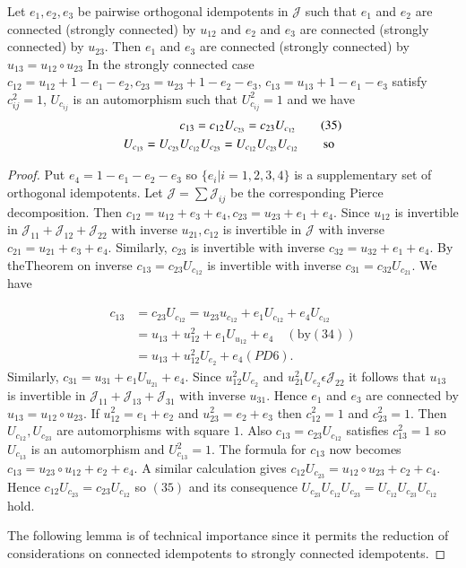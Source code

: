 \setcounter{lemma}{0}
\begin{lemma}\label{c2:sec3:lem1}
  Let $e_1,e_2,e_3$ be pairwise orthogonal idempotents in
  $\mathscr{J}$ such that $e_1$ and $e_2$ are connected (strongly
  connected) by $u_{12}$ and $e_2$ and $e_3$ are connected (strongly
  connected) by $u_{23}$. Then $e_1$ and $e_3$ are connected (strongly
  connected) by $u_{13}=u_{12}\circ u_{23}$ In the strongly connected
  case $c_{12}=u_{12}+1-e_1-e_2,c_{23}=u_{23}+1-e_{2}-e_3$,
  $c_{13}=u_{13}+1-e_1-e_3$ satisfy $c^{2}_{ij}=1$, $U_{c_{ij}}$ is an
  automorphism such that $U^{2}_{c_{ij}}=1$ and we have
\begin{align*}
&c_{13}=c_{12}U_{c_{23}}=c_{23}U_{c_{12}}\tag{35}\label{c2:eq35}\\
U_{c_{13}}=U_{c_{23}}&U_{c_{12}}U_{c_{23}}=U_{c_{12}}U_{c_{23}}U_{c_{12}}\tag*{\text{so}}
\end{align*}
\end{lemma}

\begin{proof}
Put $e_4=1-e_1-e_2-e_3$ so $\{e_i|i=1,2,3,4\}$ is a supplementary set
of orthogonal idempotents. Let $\mathscr{J}=\sum\mathscr{J}_{ij}$ be
the corresponding Pierce decomposition. Then
$c_{12}=u_{12}+e_3+e_4,c_{23}=u_{23}+e_1+e_4$. Since $u_{12}$ is
invertible in $\mathscr{J}_{11}+\mathscr{J}_{12}+\mathscr{J}_{22}$
with inverse $u_{21},c_{12}$ is invertible in $\mathscr{J}$ with
inverse $c_{21}=u_{21}+e_3+e_4$. Similarly, $c_{23}$ is invertible
with inverse $c_{32}=u_{32}+e_1+e_4$. By the\pageoriginale Theorem on
inverse $c_{13}=c_{23}U_{c_{12}}$ is invertible with inverse
$c_{31}=c_{32}U_{c_{21}}$. We have

\begin{align*}
c_{13}&=c_{23}U_{c_{12}}= u_{23} u_{c_{12}} + e_1 U_{c_{12}} + e_4U_{c_{12}}\\
&=u_{13}+u^{2}_{12}+e_1U_{u_{12}}+e_{4}\quad (\text{by} (34))\\
&=u_{13}+u^{2}_{12}U_{e_{2}}+e_4 (PD 6).
\end{align*}
Similarly, $c_{31}=u_{31}+e_1U_{u_{21}}+e_4$. Since
$u^{2}_{12}U_{e_{2}}$ and $u^{2}_{21}U_{e_{2}}\epsilon
\mathscr{J}_{22}$ it follows that $u_{13}$ is invertible in
$\mathscr{J}_{11}+\mathscr{J}_{13}+\mathscr{J}_{31}$ with inverse
$u_{31}$. Hence $e_{1}$ and $e_{3}$ are connected by
$u_{13}=u_{12}\circ u_{23}$. If $u^{2}_{12}=e_1+e_2$ and
$u^{2}_{23}=e_2+e_3$ then $c^{2}_{12}=1$ and $c^{2}_{23}=1$. Then
$U_{c_{12}}, U_{c_{23}}$ are automorphisms with square $1$. Also
$c_{13}=c_{23}U_{c_{12}}$ satisfies $c^{2}_{13}=1$ so $U_{c_{13}}$ is
an automorphism and $U^{2}_{c_{13}}=1$. The formula for $c_{13}$ now
becomes $c_{13}=u_{23}\circ u_{12}+e_{2}+e_{4}$. A similar calculation
gives $c_{12}U_{c_{23}}=u_{12}\circ u_{23}+c_2+c_4$. Hence
$c_{12}U_{c_{23}}=c_{23}U_{c_{12}}$ so $(35)$ and its consequence
$U_{c_{23}} U_{c_{12}}U_{c_{23}}=U_{c_{12}}U_{c_{23}}U_{c_{12}}$ hold.

The following lemma is of technical importance since it permits the
reduction of considerations on connected idempotents to strongly
connected idempotents.
\end{proof}

